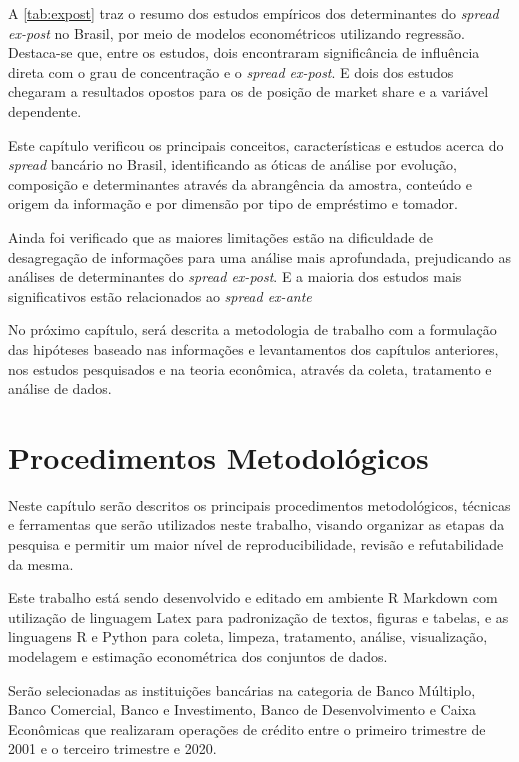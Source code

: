 \documentclass[12pt,12pt,openright,oneside,a4paper,chapter=TITLE,section=TITLE,subsection=TITLE,subsubsection=TITLE,english,french,spanish,portugues,sumario=tradicional]{abntex2}
\begin{document}
A \autoref{tab:expost} traz o resumo dos estudos empíricos dos determinantes do
\emph{spread ex-post} no Brasil, por meio de modelos econométricos utilizando
regressão. Destaca-se que, entre os estudos, dois encontraram significância de
influência direta com o grau de concentração e o \emph{spread ex-post}. E dois dos
estudos chegaram a resultados opostos para os de posição de market share e a
variável dependente.

Este capítulo verificou os principais conceitos, características e estudos acerca do \emph{spread} bancário no Brasil, identificando as óticas de análise por evolução, composição e determinantes através da abrangência da amostra, conteúdo e origem da informação e por dimensão por tipo de empréstimo e tomador.

Ainda foi verificado que as maiores limitações estão na dificuldade de desagregação de informações para uma análise mais aprofundada, prejudicando as análises de determinantes do \emph{spread ex-post}. E a maioria dos estudos mais significativos estão relacionados ao \emph{spread ex-ante}

No próximo capítulo, será descrita a metodologia de trabalho com a formulação
das hipóteses baseado nas informações e levantamentos dos capítulos anteriores,
nos estudos pesquisados e na teoria econômica, através da coleta, tratamento e
análise de dados.

\textual
\pagestyle{simple}

\chapter{Procedimentos Metodológicos}

Neste capítulo serão descritos os principais procedimentos metodológicos, técnicas e ferramentas que serão utilizados neste trabalho, visando organizar as etapas da pesquisa e permitir um maior nível de reproducibilidade, revisão e refutabilidade da mesma.

Este trabalho está sendo desenvolvido e editado em ambiente R Markdown com utilização de linguagem Latex para padronização de textos, figuras e tabelas, e as linguagens R e Python para coleta, limpeza, tratamento, análise, visualização, modelagem e estimação econométrica dos conjuntos de dados.

Serão selecionadas as instituições bancárias na categoria de Banco Múltiplo, Banco Comercial, Banco e Investimento, Banco de Desenvolvimento e Caixa Econômicas que realizaram operações de crédito entre o primeiro trimestre de 2001 e o terceiro trimestre e 2020.
\end{document}
